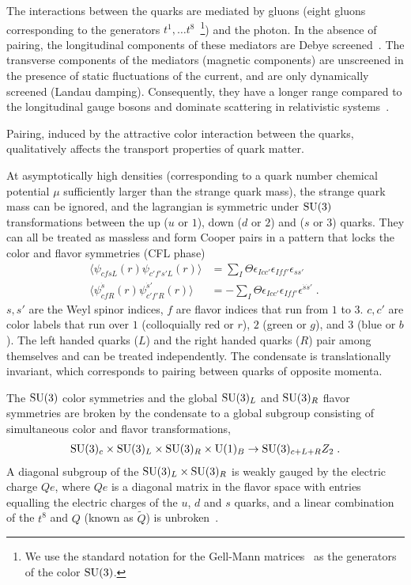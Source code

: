 \documentclass[10pt, aps, prd, superscriptaddress, nofootinbib, 
               amsmath, amssymb, twocolumn,
               preprintnumbers, showpacs,
               raggedbottom,
               floatfix]{revtex4-1}
\newcommand{\sdot}{{\dot{s}}}
\newcommand{\SU}{{\rm{SU}}}
\begin{document}
The interactions between the quarks are mediated by gluons (eight gluons
corresponding to the generators $t^1,\dots t^8$~\footnote{We use the standard
notation for the Gell-Mann matrices~\cite{Peskin:257493} as the generators of the color $\SU(3)$.}) and the photon. In
the absence of pairing, the longitudinal components of these mediators are
Debye screened~\cite{Madsen:1992}. The transverse components of the mediators (magnetic
components) are unscreened in the presence of static fluctuations of the
current, and are only dynamically screened (Landau damping). Consequently, they
have a longer range compared to the longitudinal gauge bosons and dominate 
scattering in relativistic systems~\cite{Heiselberg:1993}.

Pairing, induced by the attractive color interaction between the quarks,
qualitatively affects the transport properties of quark matter. 

At asymptotically high densities (corresponding to a quark number chemical
potential $\mu$ sufficiently larger than the strange quark mass), the
strange quark mass can be ignored, and the lagrangian is symmetric under
${\rm{SU}}(3)$ transformations between the up ($u$ or $1$), down ($d$ or $2$)
and ($s$ or $3$) quarks. They can all be treated as massless and form Cooper
pairs in a pattern that locks the color and flavor symmetries (CFL
phase)~\cite{Alford:1998mk} 
\begin{equation}
\begin{split}
\langle\psi_{cfsL}(r)\psi_{c'f's'L}(r)\rangle &= \sum_I \Theta 
\epsilon_{Icc'}\epsilon_{Iff'}\epsilon_{ss'}\\
\langle\psi_{cfR}^{\sdot}(r)\psi_{c'f'R}^{\sdot'}(r)\rangle &= -\sum_I \Theta
\epsilon_{Icc'}\epsilon_{Iff'}\epsilon^{\sdot\sdot'}\;.~\label{eq:CFLcondensate}
\end{split}
\end{equation}
$s, s'$ are the Weyl spinor indices, $f$ are flavor indices that run from $1$
to $3$. $c,c'$ are color labels that run over $1$ (colloquially red or $r$),
$2$ (green or $g$), and $3$ (blue or $b$). The left handed quarks ($L$) and the
right handed quarks ($R$) pair among themselves and can be treated
independently. The condensate is translationally invariant, which corresponds to
pairing between quarks of opposite momenta. 

The $\SU(3)$ color symmetries and the global $\SU(3)_L$ and $\SU(3)_R$ flavor
symmetries are broken by the condensate to a global subgroup consisting of
simultaneous color and flavor transformations,
\begin{equation}
\begin{split}
\SU(3)_c\times\SU(3)_L\times\SU(3)_R\times {\rm{U}}(1)_B
\rightarrow \SU(3)_{c+L+R}Z_2\label{eq:CFLsymmetry}\;.
\end{split}
\end{equation}
A diagonal subgroup of the $\SU(3)_L\times\SU(3)_R$ is weakly
gauged by the electric charge $Qe$, where $Qe$ is a diagonal matrix in the
flavor space with entries equalling the electric charges of the $u$, $d$
and $s$ quarks, and a linear combination of the $t^8$ and $Q$ (known as
$\tilde{Q}$) is unbroken~\cite{Alford:1998mk,Alford:1999pb}.
\end{document}
